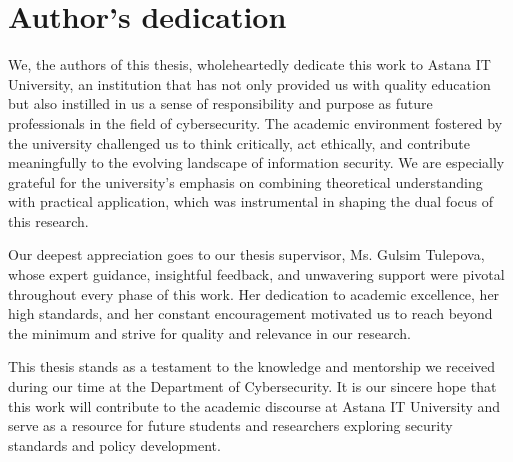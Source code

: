 %
%
\chapter{Author's dedication}
\begin{SingleSpace}


\noindent\hspace{2em}We, the authors of this thesis, wholeheartedly dedicate this work to Astana IT University, an institution that has not only provided us with quality education but also instilled in us a sense of responsibility and purpose as future professionals in the field of cybersecurity. The academic environment fostered by the university challenged us to think critically, act ethically, and contribute meaningfully to the evolving landscape of information security. We are especially grateful for the university’s emphasis on combining theoretical understanding with practical application, which was instrumental in shaping the dual focus of this research.

Our deepest appreciation goes to our thesis supervisor, Ms. Gulsim Tulepova, whose expert guidance, insightful feedback, and unwavering support were pivotal throughout every phase of this work. Her dedication to academic excellence, her high standards, and her constant encouragement motivated us to reach beyond the minimum and strive for quality and relevance in our research.

This thesis stands as a testament to the knowledge and mentorship we received during our time at the Department of Cybersecurity. It is our sincere hope that this work will contribute to the academic discourse at Astana IT University and serve as a resource for future students and researchers exploring security standards and policy development.

\end{SingleSpace}
\clearpage